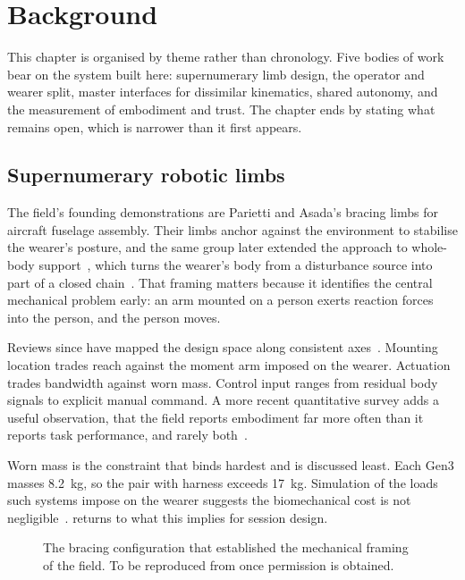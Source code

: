 \chapter{Background}
\label{ch:background}

This chapter is organised by theme rather than chronology. Five bodies of work
bear on the system built here: supernumerary limb design, the operator and
wearer split, master interfaces for dissimilar kinematics, shared autonomy,
and the measurement of embodiment and trust. The chapter ends by stating what
remains open, which is narrower than it first appears.

\section{Supernumerary robotic limbs}

The field's founding demonstrations are Parietti and Asada's bracing limbs for
aircraft fuselage assembly. Their limbs anchor against the environment to
stabilise the wearer's posture, and the same group later extended the
approach to whole-body support~\cite{parietti2016support}, which turns the wearer's body from a
disturbance source into part of a closed
chain~\cite{parietti2014bracing,parietti2013dynamic}. That framing matters
because it identifies the central mechanical problem early: an arm mounted on
a person exerts reaction forces into the person, and the person moves.

Reviews since have mapped the design space along consistent
axes~\cite{yang2021srlreview,prattichizzo2021augmentation,tong2021srlreview,zhang2023srlreview}.
Mounting location trades reach against the moment arm imposed on the wearer.
Actuation trades bandwidth against worn mass. Control input ranges from
residual body signals to explicit manual command. A more recent quantitative
survey adds a useful observation, that the field reports embodiment far more
often than it reports task performance, and rarely
both~\cite{zheng2026quantitative}.

Worn mass is the constraint that binds hardest and is discussed least. Each
Gen3 masses \SI{8.2}{\kilo\gram}, so the pair with harness exceeds
\SI{17}{\kilo\gram}. Simulation of the loads such systems impose on the wearer
suggests the biomechanical cost is not
negligible~\cite{moon2024impact}.  returns to what this
implies for session design.

\begin{figure}[htbp]
  \centering
  \caption[Bracing supernumerary limbs (reproduced)]{The bracing
  configuration that established the mechanical framing of the field. To be
  reproduced from \cite{parietti2014bracing} once permission is obtained.}
  \label{fig:repro-bracing}
\end{figure}

